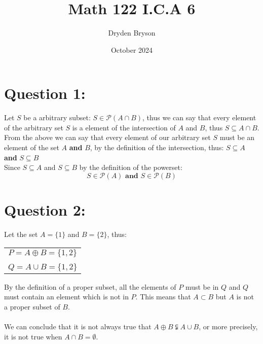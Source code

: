 \documentclass{article}
\title{Math 122 I.C.A 6}
\author{Dryden Bryson}
\date{October 2024}
\begin{document}
\maketitle

\newpage
\section*{Question 1:}
Let $S$ be a arbitrary subset: $S\in \mathcal{P}(A\cap B)$, thus we can say that every element of the arbitrary set $S$ is a element of the intersection of $A$ and $B$, thus $S \subseteq A \cap B$.\\

From the above we can say that every element of our arbitrary set $S$ must be an element of the set $A$ \textbf{and} $B$, by the definition of the intersection, thus: $S\subseteq A$ \textbf{and} $S\subseteq B$\\

Since $S \subseteq A$ and $S \subseteq B$ by the definition of the powerset: $$S\in\mathcal{P}(A) \textbf{   and   }  S\in\mathcal{P}(B)$$


\newpage
\section*{Question 2:}
Let the set $A=\{1\}$ and $B=\{2\}$, thus: 


\begin{table}[htp]
    \centering
    \begin{tabular}{c}
        $P= A\oplus B = \{1,2\}$ \\\\ $Q=A\cup B = \{1,2\}$
    \end{tabular}
\end{table}

By the definition of a proper subset, all the elements of $P$ must be in $Q$ and $Q$ must contain an element which is not in $P$. This means that $A \subset B$ but $A$ is not a proper subset of $B$. \\\\We can conclude that it is not always true that $A \oplus B \subsetneqq A \cup B$, or more precisely, it is not true when $A \cap B = \emptyset$.
\end{document}
